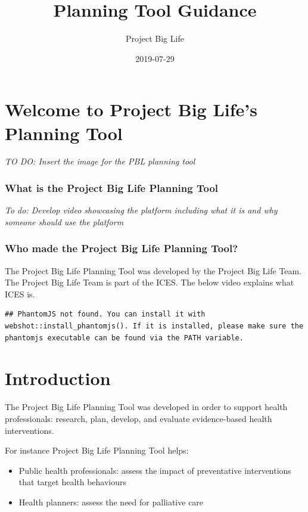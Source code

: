 \documentclass[]{book}
\title{Planning Tool Guidance}
\author{Project Big Life}
\date{2019-07-29}
\providecommand{\tightlist}{%
  \setlength{\itemsep}{0pt}\setlength{\parskip}{0pt}}
\begin{document}
\maketitle

{
\setcounter{tocdepth}{1}
\tableofcontents
}
\chapter{Welcome to Project Big Life's Planning
Tool}\label{welcome-to-project-big-lifes-planning-tool}

\emph{TO DO: Insert the image for the PBL planning tool}

\subsection{What is the Project Big Life Planning
Tool}\label{what-is-the-project-big-life-planning-tool}

\emph{To do: Develop video showcasing the platform including what it is
and why someone should use the platform}

\subsection{Who made the Project Big Life Planning
Tool?}\label{who-made-the-project-big-life-planning-tool}

The Project Big Life Planning Tool was developed by the Project Big Life
Team. The Project Big Life Team is part of the ICES. The below video
explains what ICES is.

\begin{verbatim}
## PhantomJS not found. You can install it with webshot::install_phantomjs(). If it is installed, please make sure the phantomjs executable can be found via the PATH variable.
\end{verbatim}

\chapter{Introduction}\label{introduction}

The Project Big Life Planning Tool was developed in order to support
health professionals: research, plan, develop, and evaluate
evidence-based health interventions.

For instance Project Big Life Planning Tool helps:

\begin{itemize}
\tightlist
\item
  Public health professionals: assess the impact of preventative
  interventions that target health behaviours
\item
  Health planners: assess the need for palliative care
\end{itemize}
\end{document}
